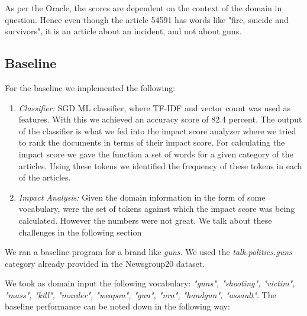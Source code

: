 \documentclass{article}
\begin{document}
As per the Oracle, the scores are dependent on the context of the domain in question.
Hence even though the article 54591 has words like "fire, suicide and survivors", it is an article about an incident, and not about guns.

\subsection{Baseline}
For the baseline we implemented the following:

\begin{enumerate}
	\item \textit{Classifier:} SGD ML classifier, where TF-IDF and vector count was used as features. With this we achieved an accuracy score of 82.4 percent.
	The output of the classifier is what we fed into the impact score analyzer where we tried to rank the documents in terms of their impact score. For calculating the impact score we gave the function a set of words for a given category of the articles. Using these tokens we identified the frequency of these tokens in each of the articles. 

	\item \textit {Impact Analysis:} Given the domain information in the form of some vocabulary, were the set of tokens against which the impact score was being calculated.  However the numbers were not great. We talk about these challenges in the following section
\end{enumerate}

We ran a baseline program for a brand like \textit{guns}. We used the \textit{talk.politics.guns} category already provided in the Newsgroup20 dataset. 

We took as domain input the following vocabulary: \textit{"guns", "shooting", "victim", "mass", "kill", "murder", "weapon", "gun", "nra", "handgun", "assault"}. The baseline performance can be noted down in the following way:
\end{document}
